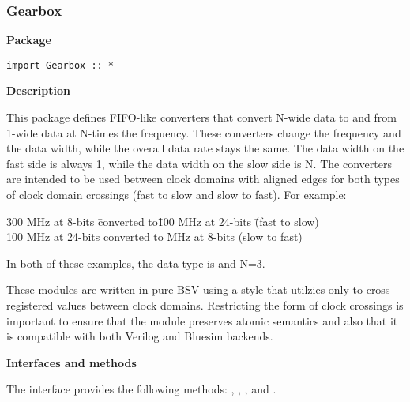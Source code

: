 \subsubsection{Gearbox}


\label{Gearbox}

{\bf Package}


\begin{verbatim}
import Gearbox :: *
\end{verbatim}



{\bf Description} 

This package defines  FIFO-like converters that convert N-wide data to
and from 1-wide data at N-times the frequency. These converters
change the frequency and the data width, while the overall
data rate stays the same.  The data width on the fast side is always
1, while the data width on the slow side is N.  The converters are intended to
be used between clock 
domains with aligned edges for both types of clock domain crossings
(fast to slow and slow to fast). For example:
\begin{tabbing}
300 MHz at 8-bits  \hm \= converted to\hm \=  100 MHz at 24-bits \hm \=(fast
to slow)\\ 
100 MHz at 24-bits\>   converted to MHz at 8-bits \>(slow to
fast)\\
\end{tabbing}
In both of these examples, the data type  is  and 
N=3.


These modules are written in pure BSV using a style that utilzies only
 to cross registered values between clock
domains.  Restricting the form of clock crossings is important to
ensure that the module preserves atomic semantics and also that it is
compatible with both Verilog and Bluesim backends.


{\bf Interfaces and methods}

The  interface provides the following methods: ,
, ,  and . 



